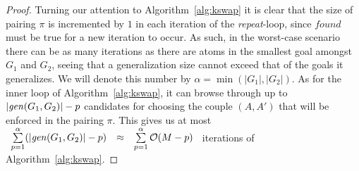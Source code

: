 \begin{proof}
	
	
	
Turning our attention to Algorithm~\ref{alg:kswap} it is clear that the size of pairing $\pi$ is incremented by $1$ in each iteration of the \textit{repeat}-loop, since $found$ must be true for a new iteration to occur. As such, in the worst-case scenario there can be as many iterations as there are atoms in the smallest goal amongst $G_1$ and $G_2$, seeing that a generalization size cannot exceed that of the goals it generalizes. We will denote this number by $\alpha = \min(|G_1|, |G_2|)$.
%
As for the inner loop of Algorithm~\ref{alg:kswap}, it can browse through up to $|\mathit{gen}(G_1, G_2)| - p$ candidates for choosing the couple $(A,A')$ that will be enforced in the pairing $\pi$. This gives us at most $
	\begin{array}{lll}
	\sum\limits_{p=1}^{\alpha}(|\mathit{gen}(G_1, G_2)| - p) &\approx &\sum\limits_{p=1}^{\alpha}\mathcal{O}(M - p)
	\end{array}
	$ %
	iterations of Algorithm~\ref{alg:kswap}.

\end{proof}
